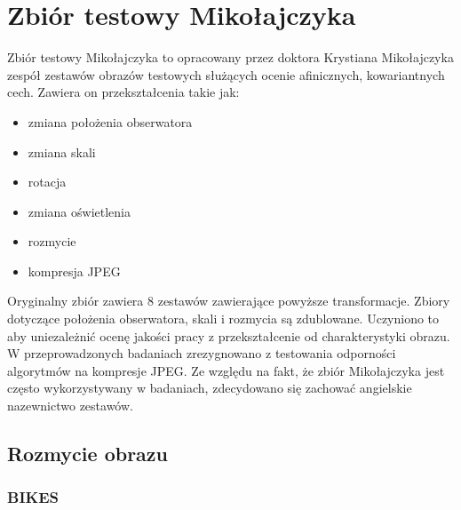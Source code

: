 \chapter{Zbiór testowy Mikołajczyka}
Zbiór testowy Mikołajczyka to opracowany przez doktora Krystiana Mikołajczyka zespół zestawów obrazów testowych służących ocenie afinicznych, kowariantnych cech. Zawiera on przekształcenia takie jak:
\begin{itemize}
\item zmiana położenia obserwatora
\item zmiana skali 
\item rotacja
\item zmiana oświetlenia
\item rozmycie
\item kompresja JPEG
\end{itemize}
Oryginalny zbiór zawiera 8 zestawów zawierające powyższe transformacje. Zbiory dotyczące położenia obserwatora, skali i rozmycia są zdublowane. Uczyniono to aby uniezależnić ocenę jakości pracy z  przekształcenie od charakterystyki obrazu. W przeprowadzonych badaniach zrezygnowano z testowania odporności algorytmów na kompresje JPEG. Ze względu na fakt, że zbiór Mikołajczyka jest często wykorzystywany w badaniach, zdecydowano się zachować angielskie nazewnictwo zestawów.
\FloatBarrier
\newpage
\section{Rozmycie obrazu}
\FloatBarrier
\subsection{BIKES}


